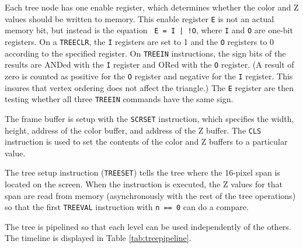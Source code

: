 \documentclass{book}
\begin{document}

Each tree node has one enable register, which determines whether the
color and Z values should be written to memory.  This enable register
{\tt E} is not an actual memory bit, but instead is the equation {\tt
E = I | !O}, where {\tt I} and {\tt O} are one-bit registers.  On a
{\tt TREECLR}, the {\tt I} registers are set to 1 and the {\tt O}
registers to 0 according to the specified register.  On {\tt TREEIN}
instructions, the sign bits of the results are ANDed with the {\tt I}
register and ORed with the {\tt O} register.  (A result of zero is
counted as positive for the {\tt O} register and negative for the {\tt I}
register.  This insures that vertex ordering does not affect the triangle.)
The {\tt E} register are then testing whether all three {\tt TREEIN}
commands have the same sign.


The frame buffer is setup with the {\tt SCRSET} instruction, which
specifies the width, height, address of the color buffer, and address
of the Z buffer.  The {\tt CLS} instruction is used to set the
contents of the color and Z buffers to a particular value.

The tree setup instruction ({\tt TREESET}) tells the tree where the
16-pixel span is located on the screen.  When the instruction is
executed, the Z values for that span are read from memory
(asynchronously with the rest of the tree operations) so that the first
{\tt TREEVAL} instruction with {\tt n == 0} can do a compare.


The tree is pipelined so that each level can be used independently of
the others.  The timeline is displayed in Table \ref{tab:treepipeline}.
\end{document}
